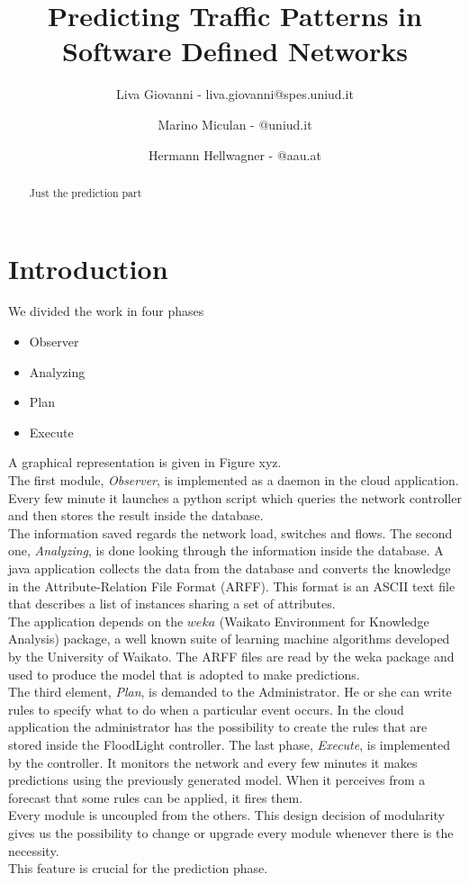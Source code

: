 \documentclass[12pt]{article}
\title{Predicting Traffic Patterns in\\ Software Defined Networks}
\author{
	Liva Giovanni - liva.giovanni@spes.uniud.it
	\and
	Marino Miculan - @uniud.it
	\and
	Hermann Hellwagner - @aau.at
}
\date{}
\begin{document}
	
\maketitle

\begin{abstract}
	Just the prediction part
\end{abstract}


\section{Introduction}

We divided the work in four phases
\begin{itemize}
	\item Observer
	\item Analyzing
	\item Plan
	\item Execute
\end{itemize}
A graphical representation is given in Figure xyz.\\
The first module, \textit{Observer}, is implemented as a daemon in the cloud application. 
Every few minute it launches a python script which queries the network controller and then stores the result inside the database.\\
The information saved regards the network load, switches and flows.
The second one, \textit{Analyzing}, is done looking through the information inside the database. 
A java application collects the data from the database and converts the knowledge in the Attribute-Relation File Format (ARFF). 
This format is an ASCII text file that describes a list of instances sharing a set of attributes.\\
The application depends on the $weka$ (Waikato Environment for Knowledge Analysis) package, a well known suite of learning machine algorithms developed by the University of Waikato.
The ARFF files are read by the weka package and used to produce the model that is adopted to make predictions.\\
The third element, \textit{Plan}, is demanded to the Administrator.
He or she can write rules to specify what to do when a particular event occurs.
In the cloud application the administrator has the possibility to create the rules that are stored inside the FloodLight controller.
The last phase, \textit{Execute}, is implemented by the controller. 
It monitors the network and every few minutes it makes predictions using the previously generated model.
When it perceives from a forecast that some rules can be applied, it fires them.\\
Every module is uncoupled from the others. This design decision of modularity gives us the possibility to change or upgrade every module whenever there is the necessity.\\
This feature is crucial for the prediction phase. 
\end{document}
